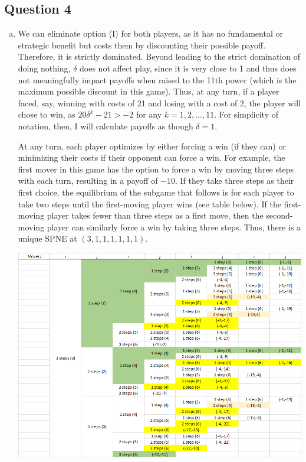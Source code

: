 \documentclass{article}
\begin{document}

\subsection*{Question 4}

\begin{enumerate}[(a)]
	\item We can eliminate option (I) for both players, as it has no fundamental or strategic benefit but costs them by discounting their possible payoff. Therefore, it is strictly dominated. Beyond leading to the strict domination of doing nothing, $\delta$ does not affect play, since it is very close to 1 and thus does not meaningfully impact payoffs when raised to the 11th power (which is the maximum possible discount in this game). Thus, at any turn, if a player faced, say, winning with costs of 21 and losing with a cost of 2, the player will chose to win, as ${20\delta^k-21>-2}$ for any ${k=1,2,...,11}$. For simplicity of notation, then, I will calculate payoffs as though ${\delta=1}$.
	
	At any turn, each player optimizes by either forcing a win (if they can) or minimizing their costs if their opponent can force a win. For example, the first mover in this game has the option to force a win by moving three steps with each turn, resulting in a payoff of $-10$. If they take three steps as their first choice, the equilibrium of the subgame that follows is for each player to take two steps until the first-moving player wins (see table below). If the first-moving player takes fewer than three steps as a first move, then the second-moving player can similarly force a win by taking three steps. Thus, there is a unique SPNE at $(3,1,1,1,1,1,1)$.
		\begin{center}
			\includegraphics[scale=.5]{table4a.png}
		\end{center}
	

\end{enumerate}
\end{document}
